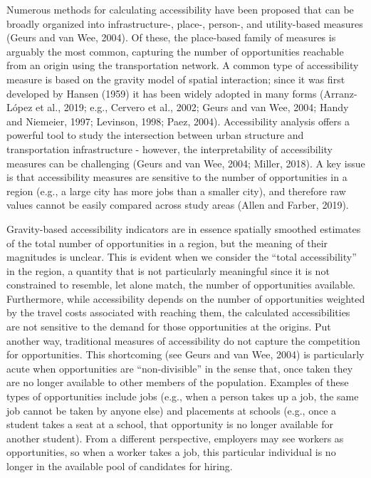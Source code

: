 \documentclass[]{elsarticle} %
\begin{document}
Numerous methods for calculating accessibility have been proposed that
can be broadly organized into infrastructure-, place-, person-, and
utility-based measures (Geurs and van Wee, 2004). Of these, the
place-based family of measures is arguably the most common, capturing
the number of opportunities reachable from an origin using the
transportation network. A common type of accessibility measure is based
on the gravity model of spatial interaction; since it was first
developed by Hansen (1959) it has been widely adopted in many forms
(Arranz-López et al., 2019; e.g., Cervero et al., 2002; Geurs and van
Wee, 2004; Handy and Niemeier, 1997; Levinson, 1998; Paez, 2004).
Accessibility analysis offers a powerful tool to study the intersection
between urban structure and transportation infrastructure - however, the
interpretability of accessibility measures can be challenging (Geurs and
van Wee, 2004; Miller, 2018). A key issue is that accessibility measures
are sensitive to the number of opportunities in a region (e.g., a large
city has more jobs than a smaller city), and therefore raw values cannot
be easily compared across study areas (Allen and Farber, 2019).

Gravity-based accessibility indicators are in essence spatially smoothed
estimates of the total number of opportunities in a region, but the
meaning of their magnitudes is unclear. This is evident when we consider
the ``total accessibility'' in the region, a quantity that is not
particularly meaningful since it is not constrained to resemble, let
alone match, the number of opportunities available. Furthermore, while
accessibility depends on the number of opportunities weighted by the
travel costs associated with reaching them, the calculated
accessibilities are not sensitive to the demand for those opportunities
at the origins. Put another way, traditional measures of accessibility
do not capture the competition for opportunities. This shortcoming (see
Geurs and van Wee, 2004) is particularly acute when opportunities are
``non-divisible'' in the sense that, once taken they are no longer
available to other members of the population. Examples of these types of
opportunities include jobs (e.g., when a person takes up a job, the same
job cannot be taken by anyone else) and placements at schools (e.g.,
once a student takes a seat at a school, that opportunity is no longer
available for another student). From a different perspective, employers
may see workers as opportunities, so when a worker takes a job, this
particular individual is no longer in the available pool of candidates
for hiring.
\end{document}
